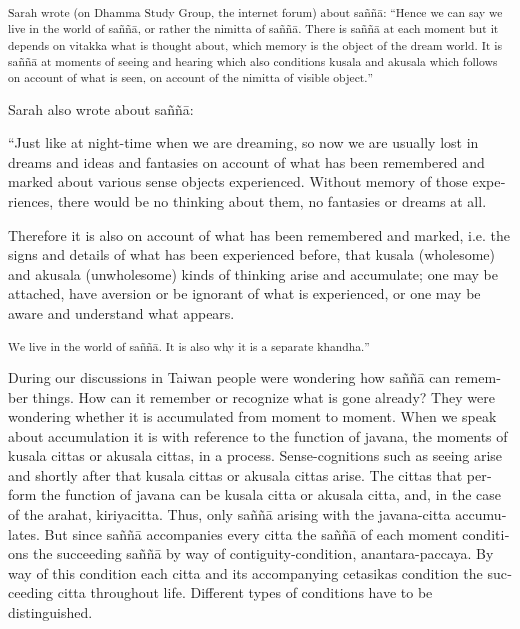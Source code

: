\textsuperscript{\textdutch{{{Sarah wrote
(}}}\textenglish[variant=american]{{{on Dhamma Study Group, the internet
forum}}}\textdutch{{{) about saññā:
``}}}\textenglish[variant=american]{{{Hence we can say we live in the
world of sa}}}{{ññ}}{{ā}}\textenglish[variant=american]{{{, or rather
the nimitta of sa}}}{{ññ}}{{ā}}\textenglish[variant=american]{{{. There
is sa}}}{{ññ}}{{ā}}{{ }}\textenglish[variant=american]{{{at each moment
but it depends on vitakka what is thought about, which memory is the
object of the dream world. It is sa}}}{{ññ}}{{ā}}{{
}}\textenglish[variant=american]{{{at moments of seeing and hearing
which also conditions kusala and akusala which follows on account of
what is seen, on account of the nimitta of visible
object.}}}\textdutch{{{''}}}}

\textdutch{Sarah also wrote about saññā: }

``\textenglish[variant=american]{Just like at night-time when we are
dreaming, so now we are usually
lo}\textdutch{st}\textenglish[variant=american]{ in dreams and ideas and
fantasies on account of what has been remembered and marked about
various sense objects experienced. Without memory of those experiences,
there would be no thinking about them, no fantasies or dreams at all.}

\textenglish[variant=american]{Therefore it is also on account of what
has been remembered and marked, i.e. the signs and details of what has
been experienced before, that kusala (wholesome) and akusala
(unwholesome) kinds of thinking arise and accumulate}\textdutch{;}
\textdutch{one may be}\textenglish[variant=american]{ attached,
hav}\textdutch{e}\textfrench{ aversion o}\textdutch{r}
\textdutch{be}\textenglish[variant=american]{ ignorant of what is
experienced, or }\textdutch{one may be}\textenglish[variant=american]{
aware and understand what appears. }

\textsuperscript{\textdutch{W}\textenglish[variant=american]{e live in
the world of sa}ññ{{ā}}\textenglish[variant=american]{. It is also why
i}\textdutch{t}\textenglish[variant=american]{ is a separate
khandha.}\textdutch{''}}

\textdutch{During our discussions in Taiwan people were wondering how
saññā can remember things. How can it remember or recognize what is gone
already? They were wondering whether it is accumulated from moment to
moment. When we speak about accumulation it is with reference to the
function of javana, the moments of kusala cittas or akusala cittas, in a
process. Sense-cognitions such as seeing arise and shortly after that
kusala cittas or akusala cittas arise. The cittas that perform the
function of javana can be kusala citta or akusala citta, and, in the
case of the arahat, kiriyacitta. Thus, only saññā arising with the
javana-citta accumulates. But since saññā accompanies every citta the
saññā of each moment conditions the succeeding saññā by way of
contiguity-condition, anantara-paccaya. By way of this condition each
citta and its accompanying cetasikas condition the succeeding citta
throughout life. Different types of conditions have to be
distinguished.}

